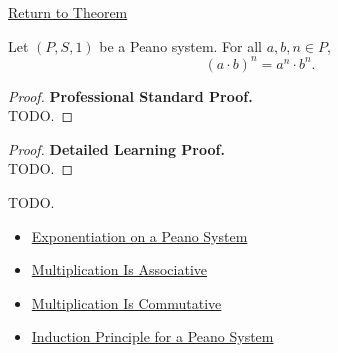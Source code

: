 \newpage
{}
\label{prf:exponent-product-law}

\begin{remark*}[Return]
\hyperref[thm:exponent-product-law]{Return to Theorem}
\end{remark*}

\begin{theorem*}
Let $(P,S,1)$ be a Peano system. For all $a,b,n \in P$,
\[
(a \cdot b)^n = a^n \cdot b^n.
\]
\end{theorem*}

\begin{proof}
\textbf{Professional Standard Proof.}~\\
TODO.
\end{proof}

\begin{proof}
\textbf{Detailed Learning Proof.}~\\
TODO.
\end{proof}

\begin{remark*}
TODO.
\end{remark*}

\begin{dependencies}
\begin{itemize}
  \item \hyperref[def:exponentiation-on-peano-system]{Exponentiation on a Peano System}
  \item \hyperref[thm:multiplication-associative]{Multiplication Is Associative}
  \item \hyperref[thm:multiplication-commutative]{Multiplication Is Commutative}
  \item \hyperref[thm:induction-principle-for-peano-system]{Induction Principle for a Peano System}
\end{itemize}
\end{dependencies}
